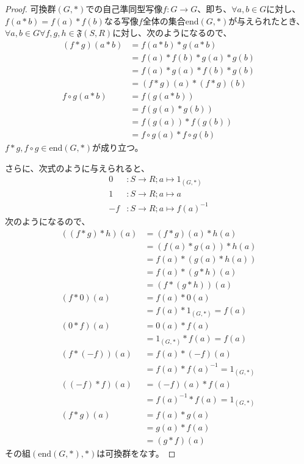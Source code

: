 \documentclass[dvipdfmx]{jsarticle}
\begin{document}
\begin{proof}
可換群$(G,*)$での自己準同型写像$f:G \rightarrow G$、即ち、$\forall a,b \in G$に対し、$f(a*b) = f(a)*f(b)$なる写像$f$全体の集合$\mathrm{end}(G,*)$が与えられたとき、$\forall a,b \in G\forall f,g,h \in \mathfrak{F}(S,R)$に対し、次のようになるので、
\begin{align*}
(f*g)(a*b) &= f(a*b)*g(a*b)\\
&= f(a)*f(b)*g(a)*g(b)\\
&= f(a)*g(a)*f(b)*g(b)\\
&= (f*g)(a)*(f*g)(b)\\
f \circ g(a*b) &= f\left( g(a*b) \right)\\
&= f\left( g(a)*g(b) \right)\\
&= f\left( g(a) \right)*f\left( g(b) \right)\\
&= f \circ g(a)*f \circ g(b)
\end{align*}
$f*g,f \circ g \in \mathrm{end}(G,*)$が成り立つ。\par
さらに、次式のように与えられると、
\begin{align*}
0&:S \rightarrow R;a \mapsto 1_{(G,*)}\\
1&:S \rightarrow R;a \mapsto a\\
- f&:S \rightarrow R;a \mapsto {f(a)}^{- 1}
\end{align*}
次のようになるので、
\begin{align*}
\left( (f*g)*h \right)(a) &= (f*g)(a)*h(a)\\
&= \left( f(a)*g(a) \right)*h(a)\\
&= f(a)*\left( g(a)*h(a) \right)\\
&= f(a)*(g*h)(a)\\
&= \left( f*(g*h) \right)(a)\\
(f*0)(a) &= f(a)*0(a)\\
&= f(a)*1_{(G,*)} = f(a)\\
(0*f)(a) &= 0(a)*f(a)\\
&= 1_{(G,*)}*f(a) = f(a)\\
\left( f*( - f) \right)(a) &= f(a)*( - f)(a)\\
&= f(a)*{f(a)}^{- 1} = 1_{(G,*)}\\
\left( ( - f)*f \right)(a) &= ( - f)(a)*f(a)\\
&= {f(a)}^{- 1}*f(a) = 1_{(G,*)}\\
(f*g)(a) &= f(a)*g(a)\\
&= g(a)*f(a)\\
&= (g*f)(a)
\end{align*}
その組$\left( \mathrm{end}(G,*),* \right)$は可換群をなす。\par

\end{proof}
\end{document}
